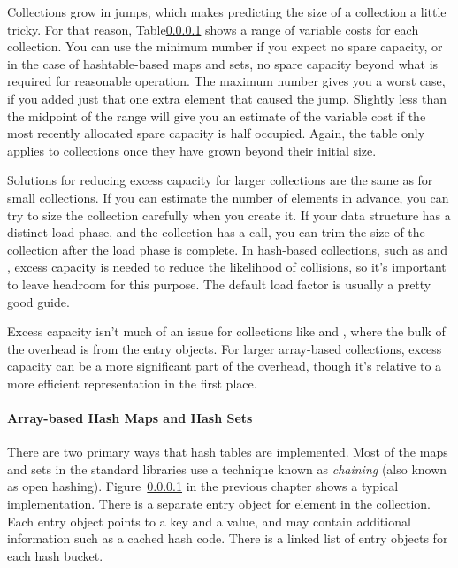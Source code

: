 Collections grow in jumps, which makes predicting the size of a collection a
little tricky.  For that reason, Table\ref{} shows
a range of variable costs for each collection.  You can use the minimum
number if you expect no spare capacity, or in the case of hashtable-based maps
and sets, no spare capacity beyond what is required for reasonable operation.
The maximum number gives you a worst case, if you added just that one extra element that caused
the jump. Slightly less than the midpoint of the range will give you an estimate of the
variable cost if the most recently allocated spare capacity is half occupied.
Again, the table only applies to collections once they have grown beyond their
initial size.

Solutions for reducing excess capacity for larger collections are the same as
for small collections. If you can estimate the number of elements in advance,
you can try to size the collection carefully when you create it.  If your data structure has a
distinct load phase, and the collection has a  call, you can
trim the size of the collection after the load phase is complete. In hash-based collections, such as
 and , excess capacity is needed to reduce the
likelihood of collisions, so it's important to leave headroom for this
purpose. The default load factor is usually a pretty good guide. 

Excess capacity isn't much of an issue for collections like
 and , where the bulk of the overhead is from the entry objects.
For larger array-based collections, excess capacity can be a more significant
part of the overhead, though it's relative to a more efficient representation in the
first place. 


\paragraph{Array-based Hash Maps and Hash Sets}

There are two primary ways that hash tables are implemented. Most of the maps and sets
in the standard libraries use a technique known as \emph{chaining} (also
known as open hashing). Figure~\ref{} in the previous chapter shows a typical
implementation. There is a separate entry object for element in the collection.
Each entry object points to a key and a value, and may contain
additional information such as a cached hash code. There is a linked list of
entry objects for each hash bucket.

